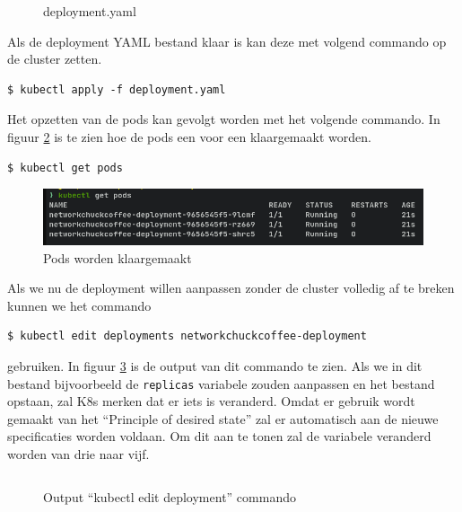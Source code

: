 \begin{figure}[h] 
	\centering
	\inputminted[fontsize=\footnotesize,linenos]{yaml}{files/deployment.yaml}
	\caption{deployment.yaml}
	\label{basicDeploy}
\end{figure}

Als de deployment YAML bestand klaar is kan deze met volgend commando op de cluster zetten.
\begin{verbatim} 
$ kubectl apply -f deployment.yaml
\end{verbatim}
Het opzetten van de pods kan gevolgt worden met het volgende commando. In figuur \ref{fig:getPodsDeployment1} is te zien hoe de pods een voor een klaargemaakt worden.
\begin{verbatim} 
$ kubectl get pods
\end{verbatim}

\begin{figure}[h]
	\centering
	\includegraphics[width=\linewidth]{img/kubectlGetPodsDeployment1.png}
	\caption{Pods worden klaargemaakt}
	\label{fig:getPodsDeployment1}
\end{figure}

Als we nu de deployment willen aanpassen zonder de cluster volledig af te breken kunnen we het commando 
\begin{verbatim} 
$ kubectl edit deployments networkchuckcoffee-deployment
\end{verbatim}
gebruiken. In figuur \ref{editDeploy1} is de output van dit commando te zien. Als we in dit bestand bijvoorbeeld de \verb|replicas| variabele zouden aanpassen en het bestand opstaan, zal K8s merken dat er iets is veranderd. Omdat er gebruik wordt gemaakt van het ``Principle of desired state'' zal er automatisch aan de nieuwe specificaties worden voldaan. Om dit aan te tonen zal de variabele veranderd worden van drie naar vijf.


\begin{figure}[h] 
	\inputminted[fontsize=\footnotesize,linenos]{yaml}{files/editDeployment.yaml}
	\caption{Output ``kubectl edit deployment'' commando}
	\label{editDeploy1}
\end{figure}

